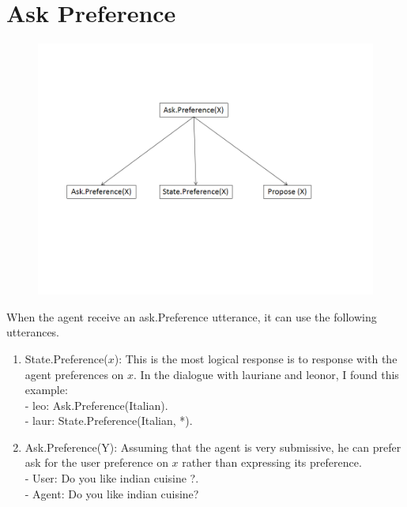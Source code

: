 \documentclass{llncs}
\begin{document}
\section{Ask Preference}

\begin{figure}
\centerline{\includegraphics[width=5in]{figs/ask.PNG}}

\end{figure}

When the agent receive an ask.Preference utterance, it can use the following utterances.
 \begin{enumerate}
 \item State.Preference($x$): This is the most logical response is to response with the agent preferences on $x$. In the dialogue with lauriane and leonor, I found this example:  
 \\ - leo: Ask.Preference(Italian).
 \\ - laur: State.Preference(Italian, *). 
 
% 
 \item Ask.Preference(Y): Assuming that the agent is very submissive, he can prefer ask for the user preference on $x$ rather than expressing its preference.
 \\ - User: Do you like indian cuisine ?.
 \\ - Agent: Do you like indian cuisine? 
 \end{enumerate}
\end{document}
